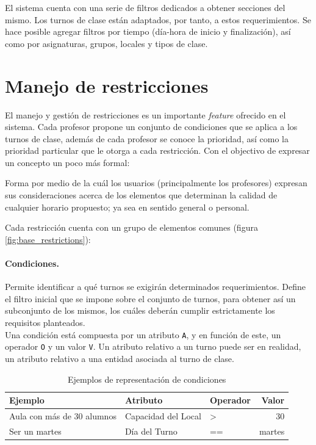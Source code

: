 El sistema cuenta con una serie de filtros dedicados a obtener secciones del mismo. Los turnos de clase están adaptados, por tanto, a estos requerimientos. Se hace posible agregar filtros por tiempo (día-hora de inicio y finalización), así como por asignaturas, grupos, locales y tipos de clase. 

\section{Manejo de restricciones}
\label{sec:restrictions}

El manejo y gestión de restricciones es un importante \textit{feature} ofrecido en el sistema. Cada profesor propone un conjunto de condiciones que se aplica a los turnos de clase, además de cada profesor se conoce la prioridad, así como la prioridad particular que le otorga a cada restricción. 
Con el objectivo de expresar un concepto un poco más formal: 
\begin{dfn}[Restricción]
	Forma por medio de la cuál los usuarios (principalmente los profesores) expresan sus consideraciones acerca de los elementos que determinan la calidad de cualquier horario propuesto; ya sea en sentido general o personal.
\end{dfn} 

Cada restricción cuenta con un grupo de elementos comunes (figura \ref{fig:base_restrictions}):\\

\paragraph{Condiciones.}
Permite identificar a qué turnos se exigirán determinados requerimientos. Define el filtro inicial que se impone sobre el conjunto de turnos, para obtener así un subconjunto de los mismos, los cuáles deberán cumplir estrictamente los requisitos planteados.\\
	
Una condición está compuesta por un atributo \texttt{A}, y en función de este, un operador \texttt{O} y un valor \texttt{V}. Un atributo relativo a un turno puede ser en realidad, un atributo relativo a una entidad asociada al turno de clase.\\

\begin{table}[h]
	\centering
	\begin{tabular}[c]{l|l|l|r}
		\textbf{Ejemplo}                   & \textbf{Atributo}     & \textbf{Operador} & \textbf{Valor} \\ 
		\hline 
		Aula con más de 30 alumnos         &  Capacidad del Local  & >                 & 30             \\ 
		Ser un martes					   & Día del Turno         & ==                & martes
	\end{tabular}
	\caption{Ejemplos de representación de condiciones}
	\label{tab:conditions}		
\end{table}

